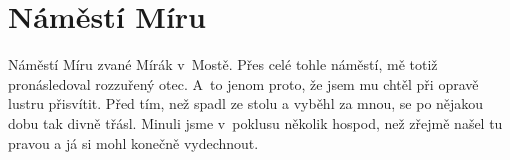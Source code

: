 
\chapter{Náměstí Míru}

Náměstí Míru zvané Mírák v~Mostě. Přes celé tohle náměstí, mě totiž
pronásledoval rozzuřený otec. A~to jenom proto, že jsem mu chtěl při opravě
lustru přisvítit. Před tím, než spadl ze stolu a vyběhl za mnou, se po nějakou
dobu tak divně třásl. Minuli jsme v~poklusu několik hospod, než zřejmě našel tu
pravou a já si mohl konečně vydechnout.

